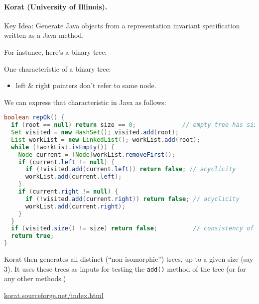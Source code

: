 \documentclass[11pt]{article}
\begin{document}
\paragraph{Korat (University of Illinois).}
Key Idea: Generate Java objects from a representation invariant specification
written as a Java method.

For instance, here's a binary tree: 

\begin{center}
\end{center}

One characteristic of a binary tree:
\begin{itemize}
\item left \& right pointers don't refer to same node.
\end{itemize}

\newpage
We can express that characteristic in Java as follows:
{\small \begin{lstlisting}[language=Java]
boolean repOk() {
  if (root == null) return size == 0; 	   	      // empty tree has size 0
  Set visited = new HashSet(); visited.add(root);
  List workList = new LinkedList(); workList.add(root);
  while (!workList.isEmpty()) {
    Node current = (Node)workList.removeFirst();
    if (current.left != null) {
      if (!visited.add(current.left)) return false; // acyclicity
      workList.add(current.left);
    }
    if (current.right != null) {
      if (!visited.add(current.right)) return false; // acyclicity
      workList.add(current.right);
    }
  }
  if (visited.size() != size) return false; 	     // consistency of size
  return true;
}
\end{lstlisting}
}

Korat then generates all distinct (``non-isomorphic'') trees, 
    up to a given size (say 3).
It uses these trees as inputs for testing 
    the {\tt add()} method of the tree (or for any other methods.)

    \begin{center}
    \url{korat.sourceforge.net/index.html}
  \end{center}
\end{document}
